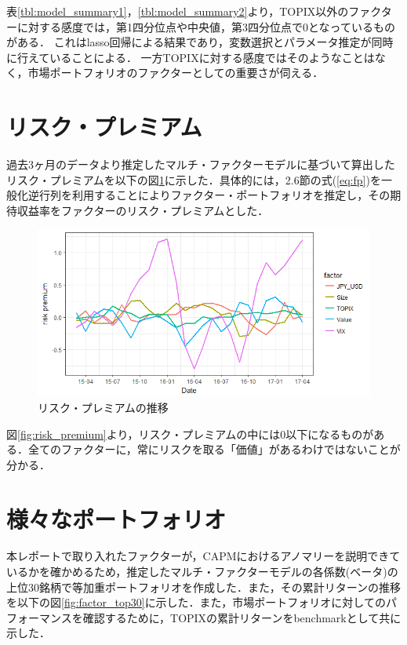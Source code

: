 ﻿\documentclass[11pt]{jreport}
\begin{document}
表\ref{tbl:model_summary1}，\ref{tbl:model_summary2}より，TOPIX以外のファクターに対する感度では，第1四分位点や中央値，第3四分位点で0となっているものがある．
これはlasso回帰による結果であり，変数選択とパラメータ推定が同時に行えていることによる．
一方TOPIXに対する感度ではそのようなことはなく，市場ポートフォリオのファクターとしての重要さが伺える．

\section{リスク・プレミアム}
過去3ヶ月のデータより推定したマルチ・ファクターモデルに基づいて算出したリスク・プレミアムを以下の図\ref{fig:riskpremium}に示した．具体的には，2.6節の式(\ref{eq:fp})を一般化逆行列を利用することによりファクター・ポートフォリオを推定し，その期待収益率をファクターのリスク・プレミアムとした．

\begin{figure}[H]
	\begin{center}
		\includegraphics[width=15cm]{./fig/riskpremium.png}
		\caption{リスク・プレミアムの推移}
		\label{fig:riskpremium}
	\end{center}
\end{figure}

図\ref{fig:risk_premium}より，リスク・プレミアムの中には0以下になるものがある．全てのファクターに，常にリスクを取る「価値」があるわけではないことが分かる．

\section{様々なポートフォリオ}

本レポートで取り入れたファクターが，CAPMにおけるアノマリーを説明できているかを確かめるため，推定したマルチ・ファクターモデルの各係数(ベータ)の上位30銘柄で等加重ポートフォリオを作成した．また，その累計リターンの推移を以下の図\ref{fig:factor_top30}に示した．また，市場ポートフォリオに対してのパフォーマンスを確認するために，TOPIXの累計リターンをbenchmarkとして共に示した．
\end{document}
